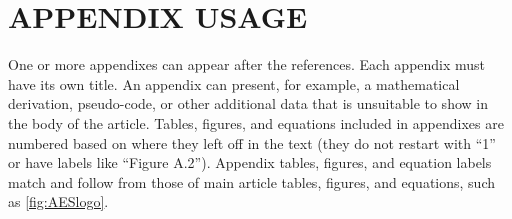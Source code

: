\documentclass[fleqn,draft]{jaes}
\begin{document}







\appendix

\section{\MakeUppercase{Appendix usage}}
One or more appendixes can appear after the references. Each appendix must have its own title. An appendix can present, for example, a mathematical derivation, pseudo-code, or other additional data that is unsuitable to show in the body of the article. Tables, figures, and equations included in appendixes are numbered based on where they left off in the text (they do not restart with ``1'' or have labels like ``Figure A.2''). Appendix tables, figures, and equation labels match and follow from those of main article tables, figures, and equations, such as \cref{fig:AESlogo}.
\end{document}
